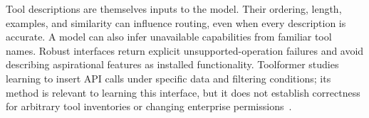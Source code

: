 Tool descriptions are themselves inputs to the model. Their ordering, length, examples, and similarity can influence routing, even when every description is accurate. A model can also infer unavailable capabilities from familiar tool names. Robust interfaces return explicit unsupported-operation failures and avoid describing aspirational features as installed functionality. Toolformer studies learning to insert API calls under specific data and filtering conditions; its method is relevant to learning this interface, but it does not establish correctness for arbitrary tool inventories or changing enterprise permissions~\cite{schick2023toolformer}.

